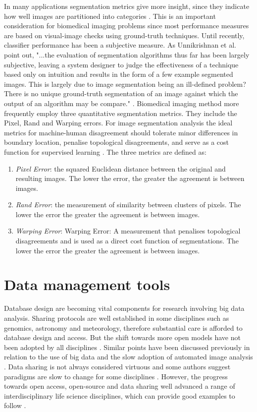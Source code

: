 In many applications segmentation metrics give more insight, since they indicate how well images are partitioned into categories \cite{Jain2010,Jain2010a}. This is an important consideration for biomedical imaging problems since most performance measures are based on visual-image checks using ground-truth techniques. Until recently, classifier performance has been a subjective measure. As Unnikrishnan et al. \cite{Unnikrishnan2007} point out, "...the evaluation of segmentation algorithms thus far has been largely subjective, leaving a system designer to judge the effectiveness of a technique based only on intuition and results in the form of a few example segmented images. This is largely due to image segmentation being an ill-defined problem? There is no unique ground-truth segmentation of an image against which the output of an algorithm may be compare." \cite[pg. 929]{Unnikrishnan2007}.
Biomedical imaging method more frequently employ three quantitative segmentation metrics. They include the Pixel, Rand and Warping errors. For image segmentation analysis the ideal metrics for machine-human disagreement should tolerate minor differences in boundary location, penalise topological disagreements, and serve as a cost function for supervised learning \cite{Jain2010,Jain2010a}. The three metrics are defined as:

\begin{enumerate}
\item \emph{Pixel Error}: the squared Euclidean distance between the original and resulting images. 
The lower the error, the greater the agreement is between images. 
\item \emph{Rand Error}: the measurement of similarity between clusters of pixels. The lower the error the greater the agreement is between images. 
\item \emph{Warping Error}: Warping Error: A measurement that penalises topological disagreements and is used as a direct cost function of segmentations. The lower the error the greater the agreement is between images. 
\end{enumerate}

\section{Data management tools}
Database design are becoming vital components for research involving big data analysis. Sharing protocols are well established in some disciplines such as genomics, astronomy and meteorology, therefore substantial care is afforded to database design and access. But the shift towards more open models have not been adopted by all disciplines \cite{Soranno2015}. Similar points have been discussed previously in relation to the use of big data\cite{Hampton2013} and the slow adoption of automated image analysis \cite[p.12]{Gaston2004}. Data sharing is not always considered virtuous \cite{Lindenmayer2013} and some authors suggest paradigms are slow to change for some disciplines \cite{Evans2011,Hampton2013,Mascaro2014}. However, the progress towards open access, open-source and data sharing well advanced a range of interdisciplinary life science disciplines, which can provide good examples to follow \cite{Reichman2011,Steiniger2009}.

